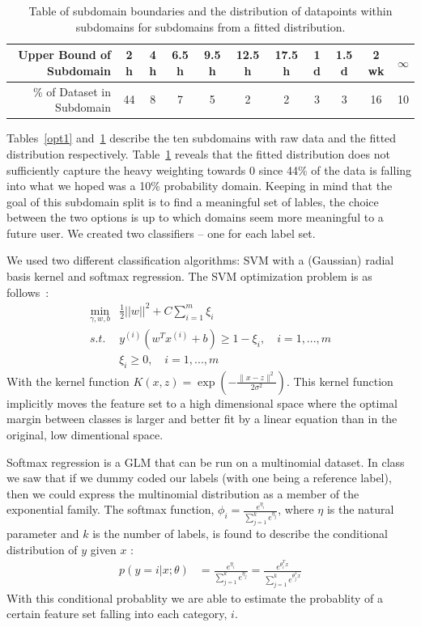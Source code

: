 \documentclass[11pt]{article}
\begin{document}
\begin{table}[!htbp]
\begin{tabular}{|r||c|c|c|c|c|c|c|c|c|c|}
\hline
Upper Bound of Subdomain & 2 h & 4 h & 6.5 h & 9.5 h & 12.5 h & 17.5 h & 1 d & 1.5 d & 2 wk & $\infty$\\
\hline
\% of Dataset in Subdomain & 44 & 8 & 7 & 5 & 2 & 2 & 3 & 3 & 16 & 10\\
\hline
\end{tabular}
\caption{Table of subdomain boundaries and the distribution of datapoints within subdomains for subdomains from a fitted distribution.}
\label{opt2}
\end{table}

Tables~\ref{opt1} and~\ref{opt2} describe the ten subdomains with raw data and the fitted distribution respectively. Table~\ref{opt2} reveals that the fitted distribution does not sufficiently capture the heavy weighting towards 0 since 44\% of the data is falling into what we hoped was a 10\% probability domain. Keeping in mind that the goal of this subdomain split is to find a meaningful set of lables, the choice between the two options is up to which domains seem more meaningful to a future user. We created two classifiers -- one for each label set.


We used two different classification algorithms: SVM with a (Gaussian) radial basis kernel and softmax regression. The SVM optimization problem is as follows~\cite{Ng:15,HCL:10,BoV:04}:
\begin{align*}
\min_{\gamma,w,b} & \frac{1}{2}||w||^2 + C \sum_{i=1}^{m}\xi_i \\
s.t. & y^{(i)}(w^Tx^{(i)} + b) \ge 1 - \xi_i, \quad i = 1,...,m \\
& \xi_i \ge 0, \quad i = 1,...,m
\end{align*}
With the kernel function $K(x,z) = \exp \left(-\frac{\|x-z\|^2}{2\sigma^2}\right)$. This kernel function implicitly moves the feature set to a high dimensional space where the optimal margin between classes is larger and better fit by a linear equation than in the original, low dimentional space. 

Softmax regression is a GLM that can be run on a multinomial dataset. In class we saw that if we dummy coded our labels (with one being a reference label), then we could express the multinomial distribution as a member of the exponential family. The softmax function, $\phi_i = \frac{e^{\eta_i}}{\sum_{j=1}^{k}e^{\eta_j}}$, where $\eta$ is the natural parameter and $k$ is the number of labels, is found to describe the conditional distribution of $y$ given $x$ : 
\begin{align*}
     p(y=i | x; \theta) &= \frac{e^{\eta_i}}{\sum_{j=1}^{k}e^{\eta_j}} =
     \frac{e^{\theta_i^Tx}}{\sum_{j=1}^{k}e^{\theta_j^Tx}}
\end{align*}
With this conditional probablity we are able to estimate the probablity of a certain feature set falling into each category, $i$.
\end{document}

